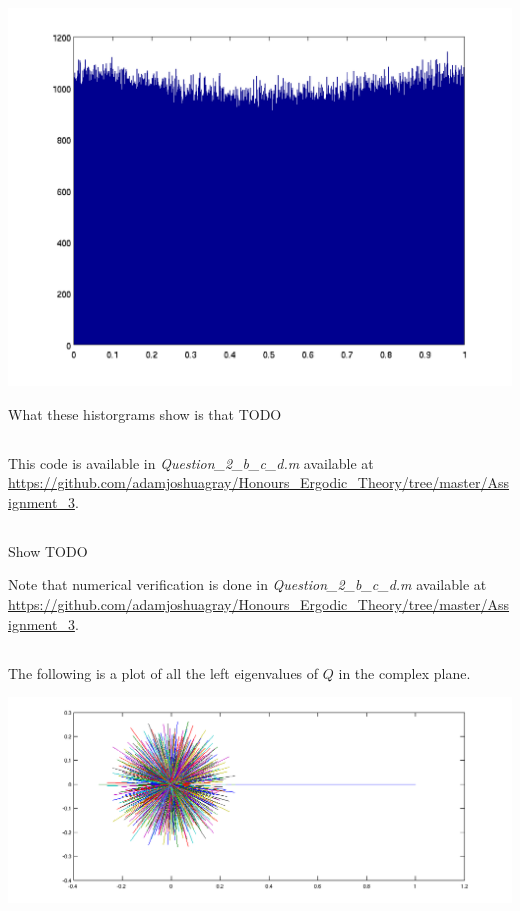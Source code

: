 \documentclass{unswmaths}
\begin{document}
\includegraphics[scale=0.3]{qn_2_a_hist_10}

What these historgrams show is that TODO

\subsection{}
This code is available in \emph{Question\_2\_b\_c\_d.m} available at \url{https://github.com/adamjoshuagray/Honours_Ergodic_Theory/tree/master/Assignment_3}.

\subsection{}
Show TODO

Note that numerical verification is done in  \emph{Question\_2\_b\_c\_d.m} available at \url{https://github.com/adamjoshuagray/Honours_Ergodic_Theory/tree/master/Assignment_3}.

\subsection{}
The following is a plot of all the left eigenvalues of $ Q $ in the complex plane. 


\includegraphics[scale=0.4]{qn_2_eigenvalues}
\end{document}
